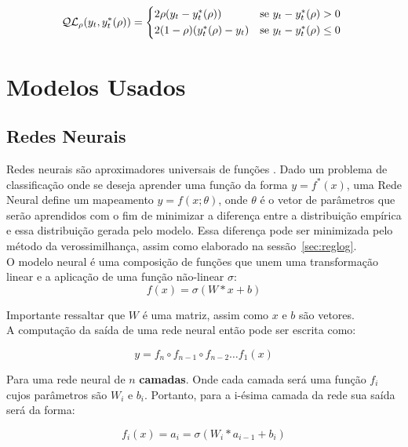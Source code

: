 \begin{equation}
  \mathcal{QL}_{\rho}(y_{t},y^{*}_{t}(\rho)) =
\begin{cases*}
  2 \rho(y_{t} - y^{*}_{t}(\rho)) & se $ y_{t} - y^{*}_{t}(\rho) > 0$ \\
  2 (1 - \rho)(y^{*}_{t}(\rho) - y_{t}) & se $y_{t} - y^{*}_{t}(\rho) \leq 0$
\end{cases*}
\end{equation}






\section{Modelos Usados} 

\subsection{Redes Neurais}

\label{sec:nn}
Redes neurais são aproximadores universais de funções \citep{nnuni}. Dado um problema
de classificação onde se deseja aprender uma função da forma $y = f^*(x)$, uma
Rede Neural define um mapeamento $y = f(x ; \theta)$, onde $\theta$ é o vetor de
parâmetros que serão aprendidos com o fim de minimizar a diferença entre a
distribuição empírica e essa distribuição gerada pelo modelo. Essa diferença pode
ser minimizada pelo método da verossimilhança, assim como elaborado na sessão~\ref{sec:reglog}.\\

O modelo neural é uma composição de funções que unem uma transformação linear e
a aplicação de uma função não-linear $\sigma$: \\

\[ f(x)=  \sigma(W*x + b) \]

Importante ressaltar que $W$ é uma matriz, assim como $x$ e $b$ são vetores. \\

A computação da saída de uma rede neural então pode ser escrita como:

\[   y = f_n \circ f_{n-1} \circ f_{n-2} \dots f_1(x)  \]

Para uma rede neural de $n$ \textbf{camadas}. Onde cada camada será uma função
$f_i$ cujos parâmetros são $W_i$ e $b_i$. Portanto, para a i-ésima camada da rede
sua saída será da forma: 

\[ f_i (x)=  a_i = \sigma(W_i*a_{i-1} + b_i) \]

